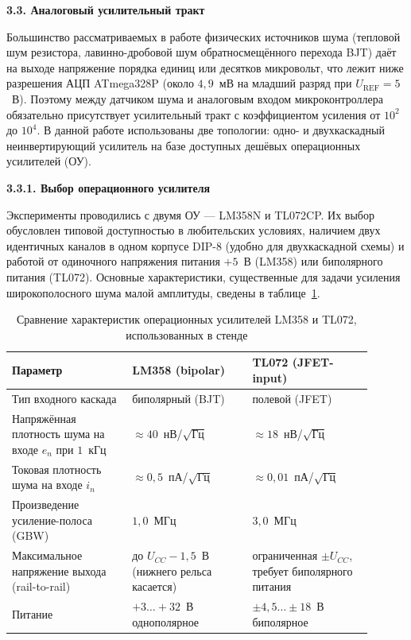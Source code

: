 \textbf{3.3. Аналоговый усилительный тракт}

Большинство рассматриваемых в работе физических источников шума (тепловой шум
резистора, лавинно-дробовой шум обратносмещённого перехода BJT) даёт на выходе
напряжение порядка единиц или десятков микровольт, что лежит ниже разрешения АЦП
ATmega328P (около $4{,}9$~мВ на младший разряд при $U_\mathrm{REF}=5$~В). Поэтому
между датчиком шума и аналоговым входом микроконтроллера обязательно присутствует
усилительный тракт с коэффициентом усиления от $10^2$ до $10^4$. В данной работе
использованы две топологии: одно- и двухкаскадный неинвертирующий усилитель на базе
доступных дешёвых операционных усилителей (ОУ).

\textbf{3.3.1. Выбор операционного усилителя}

Эксперименты проводились с двумя ОУ --- LM358N и TL072CP. Их выбор обусловлен
типовой доступностью в любительских условиях, наличием двух идентичных каналов в одном
корпусе DIP-8 (удобно для двухкаскадной схемы) и работой от одиночного напряжения
питания $+5$~В (LM358) или биполярного питания (TL072). Основные характеристики,
существенные для задачи усиления широкополосного шума малой амплитуды, сведены в
таблице~\ref{tab:opamp_compare}.

\begin{table}[htbp]
  \centering
  \footnotesize
  \caption{Сравнение характеристик операционных усилителей LM358 и TL072, использованных в стенде}
  \label{tab:opamp_compare}
  \begin{tabular}{|p{0.30\linewidth}|p{0.30\linewidth}|p{0.30\linewidth}|}
    \hline
    Параметр & LM358 (bipolar) & TL072 (JFET-input) \\
    \hline
    Тип входного каскада & биполярный (BJT) & полевой (JFET) \\
    \hline
    Напряжённая плотность шума на входе $e_n$ при $1$~кГц & ${\approx}40$~нВ/$\sqrt{\mathrm{Гц}}$ & ${\approx}18$~нВ/$\sqrt{\mathrm{Гц}}$ \\
    \hline
    Токовая плотность шума на входе $i_n$ & ${\approx}0{,}5$~пА/$\sqrt{\mathrm{Гц}}$ & ${\approx}0{,}01$~пА/$\sqrt{\mathrm{Гц}}$ \\
    \hline
    Произведение усиление-полоса (GBW) & $1{,}0$~МГц & $3{,}0$~МГц \\
    \hline
    Максимальное напряжение выхода (rail-to-rail) & до $U_{CC}-1{,}5$~В (нижнего рельса касается) & ограниченная $\pm U_{CC}$, требует биполярного питания \\
    \hline
    Питание & $+3{\ldots}+32$~В однополярное & $\pm 4{,}5{\ldots}\pm 18$~В биполярное \\
    \hline
  \end{tabular}
\end{table}

